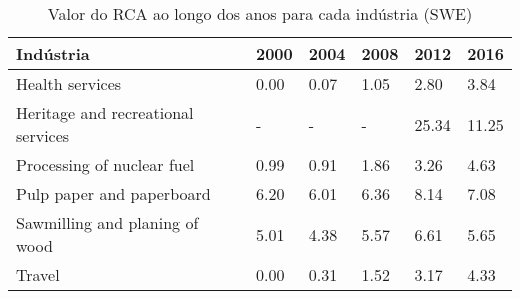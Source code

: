 \begin{table}
\centering
\caption{Valor do RCA ao longo dos anos para cada indústria (SWE)}
\label{tab:ex3-tempo-SWE}
\begin{tabular}{p{6cm}p{1.5cm}p{1.5cm}p{1.5cm}p{1.5cm}p{1.5cm}}
\toprule
                         Indústria & 2000 & 2004 & 2008 &  2012 &  2016 \\
\midrule
                   Health services & 0.00 & 0.07 & 1.05 &  2.80 &  3.84 \\
Heritage and recreational services &    - &    - &    - & 25.34 & 11.25 \\
        Processing of nuclear fuel & 0.99 & 0.91 & 1.86 &  3.26 &  4.63 \\
         Pulp paper and paperboard & 6.20 & 6.01 & 6.36 &  8.14 &  7.08 \\
    Sawmilling and planing of wood & 5.01 & 4.38 & 5.57 &  6.61 &  5.65 \\
                            Travel & 0.00 & 0.31 & 1.52 &  3.17 &  4.33 \\
\bottomrule
\end{tabular}
\end{table}
